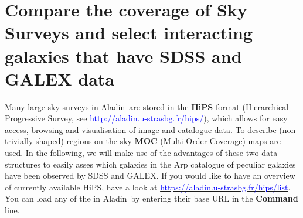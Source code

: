 \documentclass [a4paper, 12pt]{article}
\newcommand{\aladin}{{\textsc{A}{ladin}}}
\begin{document}
\section{Compare the coverage of Sky Surveys and select interacting 
galaxies that have SDSS and GALEX data}

Many large sky surveys in \aladin\ are stored in the \textbf{HiPS} format
(Hierarchical Progressive Survey, see 
\hyperref[http://aladin.u-strasbg.fr/hips/]{\textcolor{blue}
	{http://aladin.u-strasbg.fr/hips/}}),
which allows for easy access, browsing and visualisation of image and catalogue 
data. To describe (non-trivially shaped) regions on the sky \textbf{MOC} 
(Multi-Order Coverage) maps are used. In the following, we will make use of the 
advantages of these two data structures to easily asses which galaxies in the 
Arp catalogue of peculiar galaxies have been observed by SDSS and GALEX. If you 
would like to have an overview of currently available HiPS, have a look at 
\hyperref[https://aladin.u-strasbg.fr/hips/list]{\textcolor{blue}
	{https://aladin.u-strasbg.fr/hips/list}}. You can load any of the in 
\aladin\ by entering their base URL in the \textbf{Command} line.  
\end{document}
